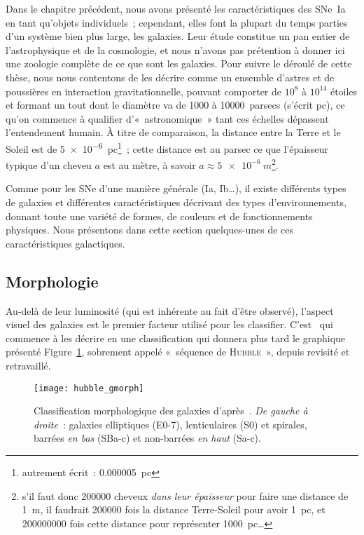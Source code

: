 \documentclass[../main/main.tex]{subfiles}
\begin{document}
Dans le chapitre précédent, nous avons présenté les caractéristiques des SNe~Ia
en tant qu'objets individuels~; cependant, elles font la plupart du temps
parties d'un système bien plus large, les galaxies. Leur étude constitue un pan
entier de l'astrophysique et de la cosmologie, et nous n'avons pas prétention à
donner ici une zoologie complète de ce que sont les galaxies. Pour suivre le
déroulé de cette thèse, nous nous contentons de les décrire comme un ensemble
d'astres et de poussières en interaction gravitationnelle, pouvant comporter de
$10^8$ à $10^{14}$ étoiles et formant un tout dont le diamètre va de \num{1000}
à \SI{10000}{parsecs} (s'écrit \si{pc}), ce qu'on commence à qualifier
d'«~astronomique~» tant ces échelles dépassent l'entendement humain. À titre de
comparaison, la distance entre la Terre et le Soleil est de
\SI{5e-6}{pc}\footnote{autrement écrit~: \SI{0.000005}{pc}}~; cette distance est
au parsec ce que l'épaisseur typique d'un cheveu $a$ est au mètre, à savoir $a
\approx \SI{5e-6}{m}$\footnote{s'il faut donc \num{200000} cheveux \textit{dans
    leur épaisseur} pour faire une distance de \SI{1}{m}, il faudrait
\num{200000} fois la distance Terre-Soleil pour avoir \SI{1}{pc}, et
\num{200000000} fois cette distance pour représenter \SI{1000}{pc}…}.

Comme pour les SNe d'une manière générale (Ia, Ib…), il existe différents types
de galaxies et différentes caractéristiques décrivant des types
d'environnements, donnant toute une variété de formes, de couleurs et de
fonctionnements physiques. Nous présentons dans cette section quelques-unes de
ces caractéristiques galactiques.

\subsection{Morphologie}\label{ssec:morphost}

Au-delà de leur luminosité (qui est inhérente au fait d'être observé), l'aspect
visuel des galaxies est le premier facteur utilisé pour les classifier.
C'est~\cite{hubble1926} qui commence à les décrire en une classification qui
donnera plus tard \citep{hubble1936} le graphique présenté
Figure~\ref{fig:gmorph}, sobrement appelé «~séquence de \textsc{Hubble}~»,
depuis revisité et retravaillé. 

\begin{figure}[ht]
    \centering
    \texttt{[image: hubble\_gmorph]}
    \caption[Classification morphologique des galaxies]{Classification
        morphologique des galaxies d'après~\cite{hubble1936}. \textit{De gauche
        à droite}~: galaxies elliptiques (E0-7), lenticulaires (S0) et spirales,
    barrées \textit{en bas} (SBa-c) et non-barrées \textit{en haut} (Sa-c).}
    \label{fig:gmorph}
\end{figure}
\end{document}
